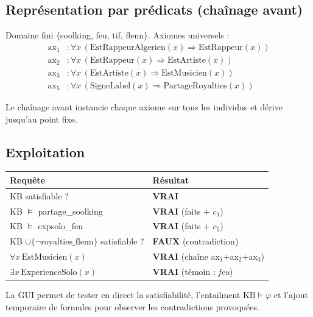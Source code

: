 \documentclass[11pt, a4paper]{article}
\begin{document}
\subsection*{Représentation par prédicats (chaînage avant)}

Domaine fini $\{$soolking, feu, tif, flenn$\}$. Axiomes universels :
\begin{align*}
\text{ax}_1 &: \forall x\,(\text{EstRappeurAlgerien}(x) \Rightarrow \text{EstRappeur}(x)) \\
\text{ax}_2 &: \forall x\,(\text{EstRappeur}(x) \Rightarrow \text{EstArtiste}(x)) \\
\text{ax}_3 &: \forall x\,(\text{EstArtiste}(x) \Rightarrow \text{EstMusicien}(x)) \\
\text{ax}_5 &: \forall x\,(\text{SigneLabel}(x) \Rightarrow \text{PartageRoyalties}(x))
\end{align*}

\noindent Le chaînage avant instancie chaque axiome sur tous les individus et
dérive jusqu'au point fixe.

\subsection*{Exploitation}

\begin{center}\small
\begin{tabular}{ll}
\toprule
\textbf{Requête} & \textbf{Résultat} \\
\midrule
KB satisfiable ?                                       & \textbf{VRAI} \\
KB $\models$ partage\_soolking                         & \textbf{VRAI} (faits + $c_1$) \\
KB $\models$ expsolo\_feu                              & \textbf{VRAI} (faits + $c_5$) \\
KB $\cup\{\lnot\text{royalties\_flenn}\}$ satisfiable ? & \textbf{FAUX} (contradiction) \\
$\forall x\,\text{EstMusicien}(x)$                     & \textbf{VRAI} (chaîne ax$_1$+ax$_2$+ax$_3$) \\
$\exists x\,\text{ExperienceSolo}(x)$                  & \textbf{VRAI} (témoin : \emph{feu}) \\
\bottomrule
\end{tabular}
\end{center}

\noindent La GUI permet de tester en direct la satisfiabilité, l'entailment
$\text{KB} \models \varphi$ et l'ajout temporaire de formules pour observer les
contradictions provoquées.
\end{document}
